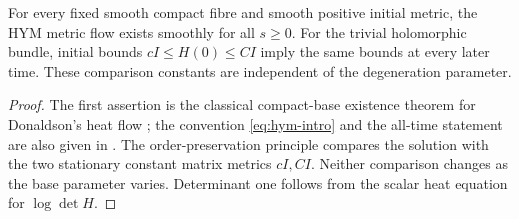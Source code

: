 \begin{lemma}\label{lem:existence-bounds}
For every fixed smooth compact fibre and smooth positive initial
metric, the HYM metric flow exists smoothly for all $s\ge0$.
For the trivial holomorphic bundle, initial bounds $cI\le H(0)\le CI$
imply the same bounds at every later time. These comparison constants
are independent of the degeneration parameter.
\end{lemma}
\begin{proof}
The first assertion is the classical compact-base existence theorem
for Donaldson's heat flow \cite{donaldson}; the convention
\eqref{eq:hym-intro} and the all-time statement are also given in
\cite[Section~4.1, equation~(4.8) and following paragraph]{hkkp}.
The order-preservation principle
\cite[Proposition~4.3]{hkkp} compares the solution with the two
stationary constant matrix metrics $cI,CI$. Neither comparison
changes as the base parameter varies. Determinant one follows from
the scalar heat equation for $\log\det H$.
\end{proof}
